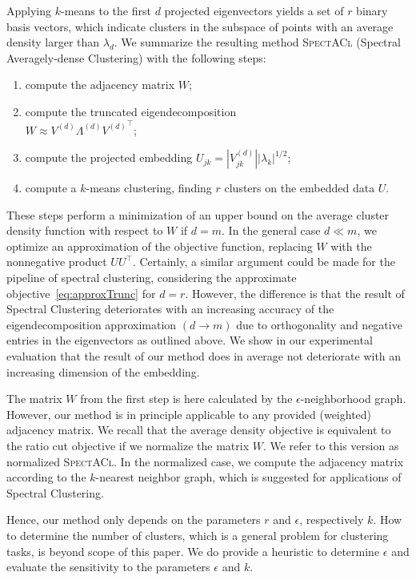 Applying $k$-means to the first $d$ projected eigenvectors yields a set of $r$ binary basis vectors, which indicate clusters in the subspace of points with an average density larger than $\lambda_d$. We summarize the resulting method \textsc{SpectACl} (Spectral Averagely-dense Clustering) with the following steps:
\begin{enumerate}
    \item compute the adjacency matrix $W$;
    \item compute the truncated eigendecomposition\\ $W\approx V^{(d)}\Lambda^{(d)}{V^{(d)}}^\top$;
    \item compute the projected embedding $U_{jk}=|V_{jk}^{(d)}||\lambda_k|^{1/2}$;
    \item compute a $k$-means clustering, finding $r$ clusters on the embedded data $U$. 
\end{enumerate}
These steps perform a minimization of an upper bound on the average cluster density function with respect to $W$ if $d=m$. In the general case $d\ll m$, we optimize an approximation of the objective function, replacing $W$ with the nonnegative product $UU^\top$. Certainly, a similar argument could be made for the pipeline of spectral clustering, considering the approximate objective~\eqref{eq:approxTrunc} for $d=r$. However, the difference is that the result of Spectral Clustering deteriorates with an increasing accuracy of the eigendecomposition approximation $(d\rightarrow m)$ due to orthogonality and negative entries in the eigenvectors as outlined above. We show in our experimental evaluation that the result of our method does in average not deteriorate with an increasing dimension of the embedding.

The matrix $W$ from the first step is here calculated by the $\epsilon$-neighborhood graph. However, our method is in principle applicable to any provided (weighted) adjacency matrix. We recall that the average density objective is equivalent to the ratio cut objective if we normalize the matrix $W$. We refer to this version as normalized \textsc{SpectACl}. In the normalized case, we compute the adjacency matrix according to the $k$-nearest neighbor graph, which is suggested for applications of Spectral Clustering.

Hence, our method only depends on the parameters $r$ and $\epsilon$, respectively $k$. How to determine the number of clusters, which is a general problem for clustering tasks, is beyond scope of this paper. We do provide a heuristic to determine $\epsilon$ and evaluate the sensitivity to the parameters $\epsilon$ and $k$. 
